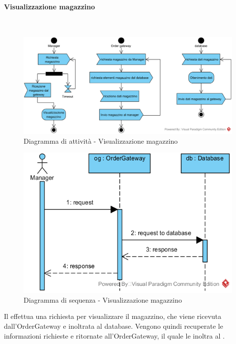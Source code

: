 \paragraph{Visualizzazione magazzino}\mbox{}\\
\nopagebreak
\begin{figure}[H]
	\centering
	\includegraphics[width=14cm]{diagrammi_img/attivita/manager_mag.png}
	\caption{Diagramma di attività - Visualizzazione magazzino}
\end{figure}

\begin{figure}[H]
	\centering
	\includegraphics[width=14cm]{../../documenti/SpecificaTecnica/diagrammi_img/sequenza/direttore_visualizza_magazzino.png}
	\caption{Diagramma di sequenza - Visualizzazione magazzino}
\end{figure}
Il \Manager{} effettua una richiesta per visualizzare il magazzino, che viene ricevuta dall'Order\-Gateway e inoltrata al database. Vengono quindi recuperate le informazioni richieste e ritornate all'Order\-Gateway, il quale le inoltra al \Manager{}.

